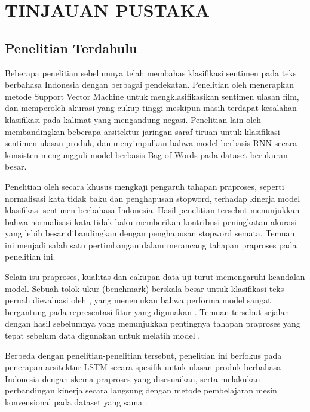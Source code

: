 
\chapter{TINJAUAN PUSTAKA}

\section{Penelitian Terdahulu}
Beberapa penelitian sebelumnya telah membahas klasifikasi sentimen
pada teks berbahasa Indonesia dengan berbagai pendekatan. Penelitian
oleh \citet{example2021} menerapkan metode Support Vector Machine
untuk mengklasifikasikan sentimen ulasan film, dan memperoleh akurasi
yang cukup tinggi meskipun masih terdapat kesalahan klasifikasi pada
kalimat yang mengandung negasi. Penelitian lain oleh
\citet{example2022} membandingkan beberapa arsitektur jaringan saraf
tiruan untuk klasifikasi sentimen ulasan produk, dan menyimpulkan
bahwa model berbasis RNN secara konsisten mengungguli model berbasis
Bag-of-Words pada dataset berukuran besar.

Penelitian oleh \citet{example2023} secara khusus mengkaji pengaruh
tahapan praproses, seperti normalisasi kata tidak baku dan penghapusan
stopword, terhadap kinerja model klasifikasi sentimen berbahasa
Indonesia. Hasil penelitian tersebut menunjukkan bahwa normalisasi
kata tidak baku memberikan kontribusi peningkatan akurasi yang lebih
besar dibandingkan dengan penghapusan stopword semata. Temuan ini
menjadi salah satu pertimbangan dalam merancang tahapan praproses
pada penelitian ini.

Selain isu praproses, kualitas dan cakupan data uji turut memengaruhi
keandalan model. Sebuah tolok ukur (benchmark) berskala besar untuk
klasifikasi teks pernah dievaluasi oleh \citet{example2016techreport},
yang menemukan bahwa performa model sangat bergantung pada
representasi fitur yang digunakan \citep{example2018incollection}.
Temuan tersebut sejalan dengan hasil sebelumnya yang menunjukkan
pentingnya tahapan praproses yang tepat sebelum data digunakan untuk
melatih model \citep{example2016techreport}.

Berbeda dengan penelitian-penelitian tersebut, penelitian ini berfokus
pada penerapan arsitektur LSTM secara spesifik untuk ulasan produk
berbahasa Indonesia dengan skema praproses yang disesuaikan, serta
melakukan perbandingan kinerja secara langsung dengan metode
pembelajaran mesin konvensional pada dataset yang sama
\citep{example2021,soemanto1993}.


